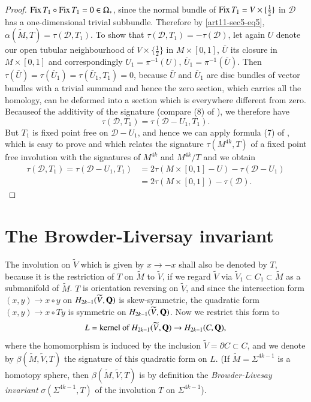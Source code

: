 \begin{proof}
$\operatorname{\mathrm{Fix}} T_{1}\circ \operatorname{\mathrm{Fix}} T_{1}=0\in \Omega_{*}$, since the normal bundle of $\operatorname{\mathrm{Fix}} T_{1}=V\times \{\frac{1}{2}\}$ in $\mathscr{D}$ has a one-dimensional trivial subbundle. Therefore by \eqref{art11-sec5-eq5}, $\alpha(\widetilde{M},T)=\tau(\mathscr{D},T_{1})$. To show that $\tau(\mathscr{D},T_{1})=-\tau(\mathscr{D})$, let again $U$ denote our open tubular neighbourhood of $V\times \{\frac{1}{2}\}$ in $M\times [0,1]$, $\overline{U}$ its closure in $M\times [0,1]$ and correspondingly $U_{1}=\pi^{-1}(U)$, $\overline{U}_{1}=\pi^{-1}(\overline{U})$. Then $\tau(\overline{U})=\tau(\overline{U}_{1})=\tau(\overline{U}_{1},T_{1})=0$, because $\overline{U}$ and $\overline{U}_{1}$ are disc bundles of vector bundles with a trivial summand and hence the zero section, which carries all the homology, can be deformed into a section which is everywhere different from zero. Because\pageoriginale of the additivity of the signature (compare (8) of \cite{art11-key7}), we therefore have
$$
\tau(\mathscr{D},T_{1})=\tau(\mathscr{D}-U_{1},T_{1}).
$$
But $T_{1}$ is fixed point free on $\mathscr{D}-U_{1}$, and hence we can apply formula (7) of \cite{art11-key7}, which is easy to prove and which relates the signature $\tau(M^{4k},T)$ of a fixed point free involution with the signatures of $M^{4k}$ and $M^{4k}/T$ and we obtain
\begin{align*}
\tau(\mathscr{D},T_{1})=\tau(\mathscr{D}-U_{1},T_{1}) &= 2\tau(M\times [0,1]-U)-\tau(\mathscr{D}-U_{1})\\[3pt]
&= 2\tau(M\times [0,1])-\tau(\mathscr{D}).
\end{align*}
\end{proof}

\section{The Browder-Liversay invariant}\label{art11-sec3}

The involution on $\widetilde{V}$ which is given by $x\to-x$ shall also be denoted by $T$, because it is the restriction of $T$ on $\widetilde{M}$ to $\widetilde{V}$, if we regard $\widetilde{V}$ via $\widetilde{V}_{1}\subset C_{1}\subset \widetilde{M}$ as a submanifold of $\widetilde{M}$. $T$ is orientation reversing on $\widetilde{V}$, and since the intersection form $(x,y)\to x\circ y$ on $H_{2k-1}(\widetilde{V},\mathbf{Q})$ is skew-symmetric, the quadratic form $(x,y)\to x\circ Ty$ is symmetric on $H_{2k-1}(\widetilde{V},\mathbf{Q})$. Now we restrict this form to
\setcounter{equation}{0}
\begin{equation}
L=\text{kernel of } H_{2k-1}(\widetilde{V},\mathbf{Q})\to H_{2k-1}(C,\mathbf{Q}),\label{art11-sec3-eq1}
\end{equation}
where the homomorphism is induced by the inclusion $\widetilde{V}=\partial C\subset C$, and we denote by $\beta(\widetilde{M},\widetilde{V},T)$ the signature of this quadratic form on $L$. (If $\widetilde{M}=\Sigma^{4k-1}$ is a homotopy sphere, then $\beta(\widetilde{M},\widetilde{V},T)$ is by definition the {\em Browder-Livesay invariant} \cite{art11-key3} $\sigma(\Sigma^{4k-1},T)$ of the involution $T$ on $\Sigma^{4k-1}$).

